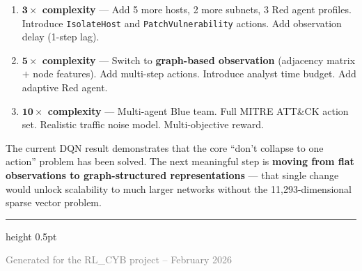 \documentclass[11pt,a4paper]{article}
\begin{document}
\begin{enumerate}[leftmargin=2em, itemsep=6pt]
    \item \textbf{$\mathbf{3\times}$ complexity} ---
        Add 5 more hosts, 2 more subnets, 3 Red agent profiles.
        Introduce \texttt{IsolateHost} and \texttt{PatchVulnerability} actions.
        Add observation delay (1-step lag).

    \item \textbf{$\mathbf{5\times}$ complexity} ---
        Switch to \textbf{graph-based observation} (adjacency matrix $+$
        node features).  Add multi-step actions.  Introduce analyst time
        budget.  Add adaptive Red agent.

    \item \textbf{$\mathbf{10\times}$ complexity} ---
        Multi-agent Blue team.  Full MITRE ATT\&CK action set.  Realistic
        traffic noise model.  Multi-objective reward.
\end{enumerate}

\vspace{0.5em}
\noindent
The current DQN result demonstrates that the core ``don't collapse to one
action'' problem has been solved.  The next meaningful step is
\textbf{moving from flat observations to graph-structured representations}
--- that single change would unlock scalability to much larger networks
without the 11,293-dimensional sparse vector problem.

\vfill
\hrule height 0.5pt
\vspace{0.5em}
\begin{center}
\small\textcolor{gray}{Generated for the RL\_CYB project -- February 2026}
\end{center}
\end{document}
